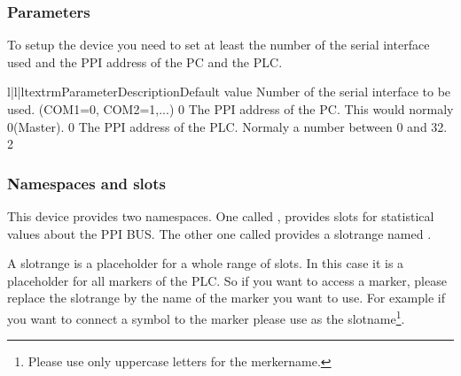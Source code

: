 \subsubsection{Parameters}
To setup the device you need to set at least the number of the serial 
interface used and the PPI address of the PC and the PLC.
\begin{tableiii}{l|l|l}{textrm}{Parameter}{Description}{Default value}
        {Number of the serial interface to be used. (COM1=0, COM2=1,...)}
        {0}
        {The PPI address of the PC. This would normaly 0(Master).}
        {0}
        {The PPI address of the PLC. Normaly a number between 0 and 32.}
        {2}
\end{tableiii}

\subsubsection{Namespaces and slots}
This device provides two namespaces. One called , provides 
slots for statistical values about the PPI BUS. The other one called 
 provides a slotrange named .

A slotrange is a placeholder for a whole range of slots. In this case it
is a placeholder for all markers of the PLC. So if you want to access a
marker, please replace the slotrange by the name of the marker you want 
to use. For example if you want to connect a symbol to the marker
 please use  as the 
slotname\footnote{Please use only uppercase letters for the merkername.}. 

